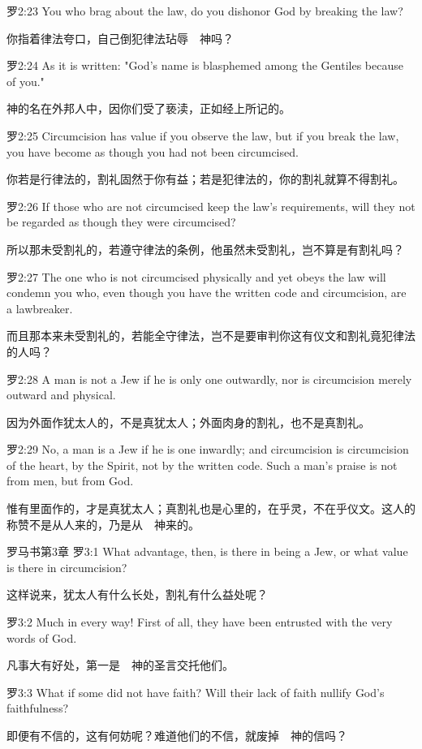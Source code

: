 \documentclass[a4paper,11pt,onecolumn,twoside]{ctexart}
\begin{document}
\begin{multicols}{2}
 罗2:23
 You who brag about the law, do you dishonor God by breaking the law?

 你指着律法夸口，自己倒犯律法玷辱　神吗？


 罗2:24
 As it is written: "God's name is blasphemed among the Gentiles because of you."

 神的名在外邦人中，因你们受了亵渎，正如经上所记的。


 罗2:25
 Circumcision has value if you observe the law, but if you break the law, you have become as though you had not been circumcised.

 你若是行律法的，割礼固然于你有益；若是犯律法的，你的割礼就算不得割礼。


 罗2:26
 If those who are not circumcised keep the law's requirements, will they not be regarded as though they were circumcised?

 所以那未受割礼的，若遵守律法的条例，他虽然未受割礼，岂不算是有割礼吗？


 罗2:27
 The one who is not circumcised physically and yet obeys the law will condemn you who, even though you have the written code and circumcision, are a lawbreaker.

 而且那本来未受割礼的，若能全守律法，岂不是要审判你这有仪文和割礼竟犯律法的人吗？


 罗2:28
 A man is not a Jew if he is only one outwardly, nor is circumcision merely outward and physical.

 因为外面作犹太人的，不是真犹太人；外面肉身的割礼，也不是真割礼。


 罗2:29
 No, a man is a Jew if he is one inwardly; and circumcision is circumcision of the heart, by the Spirit, not by the written code. Such a man's praise is not from men, but from God.

 惟有里面作的，才是真犹太人；真割礼也是心里的，在乎灵，不在乎仪文。这人的称赞不是从人来的，乃是从　神来的。


 罗马书第3章
 罗3:1
 What advantage, then, is there in being a Jew, or what value is there in circumcision?

 这样说来，犹太人有什么长处，割礼有什么益处呢？


 罗3:2
 Much in every way! First of all, they have been entrusted with the very words of God.

 凡事大有好处，第一是　神的圣言交托他们。


 罗3:3
 What if some did not have faith? Will their lack of faith nullify God's faithfulness?

 即便有不信的，这有何妨呢？难道他们的不信，就废掉　神的信吗？



\end{multicols}
\end{document}
